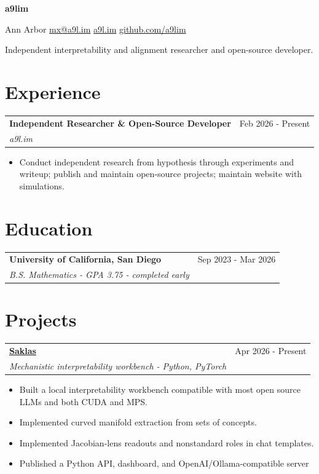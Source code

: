 \documentclass[10pt,letterpaper]{article}
\makeatletter
\newcommand{\entry}[4]{%
  \noindent\begin{tabularx}{\linewidth}{@{}X r@{}}
    \textbf{\href{#2}{#1}} & \textcolor{muted}{\small #4} \\
    \textit{#3} & \\
  \end{tabularx}\vspace{-1pt}%
}
\newcommand{\plainentry}[3]{%
  \noindent\begin{tabularx}{\linewidth}{@{}X r@{}}
    \textbf{#1} & \textcolor{muted}{\small #3} \\
    \textit{#2} & \\
  \end{tabularx}\vspace{-1pt}%
}
\makeatother
\begin{document}
\noindent
\begin{minipage}[b]{0.24\linewidth}
  {\fontsize{23}{24}\selectfont\bfseries a9lim}
\end{minipage}%
\hfill
\begin{minipage}[b]{0.74\linewidth}
  \raggedleft\small
  Ann Arbor \enspace\textbar\enspace
    \href{mailto:mx@a9l.im}{mx@a9l.im} \enspace\textbar\enspace
    \href{https://a9l.im}{a9l.im} \enspace\textbar\enspace
    \href{https://github.com/a9lim}{github.com/a9lim}
\end{minipage}
\par\vspace{6pt}
{\small\color{muted}
Independent interpretability and alignment researcher and open-source developer.
\par}
\vspace{1pt}

\section*{Experience}

\plainentry{Independent Researcher \& Open-Source Developer}{a9l.im}{Feb 2026 - Present}
\begin{itemize}
  \item Conduct independent research from hypothesis through experiments
  and writeup; publish and maintain open-source projects; maintain website with simulations.
\end{itemize}

\section*{Education}

\plainentry{University of California, San Diego}{B.S. Mathematics - GPA 3.75 - completed early}{Sep 2023 - Mar 2026}

\section*{Projects}

\entry{Saklas}{https://github.com/a9lim/saklas}{Mechanistic interpretability workbench - Python, PyTorch}{Apr 2026 - Present}
\begin{itemize}
  \item Built a local interpretability workbench compatible with most open source LLMs and both CUDA and MPS.
  \item Implemented curved manifold extraction from sets of concepts.
  \item Implemented Jacobian-lens readouts and nonstandard roles in chat templates.
  \item Published a Python API, dashboard, and OpenAI/Ollama-compatible server
\end{itemize}
\end{document}
